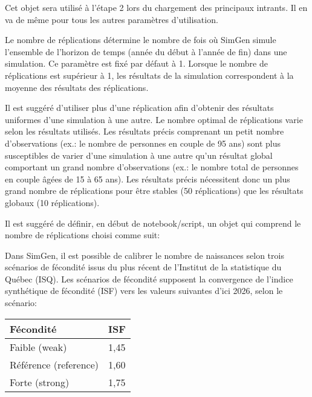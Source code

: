 \documentclass[letterpaper,10pt,french]{sphinxmanual}
\begin{document}
Cet objet sera utilisé à l’étape 2 lors du chargement des principaux intrants. Il en va de même pour tous les autres paramètres d’utilisation.


Le nombre de réplications détermine le nombre de fois où SimGen simule l’ensemble de l’horizon de temps (année du début à l’année de fin) dans une simulation.
Ce paramètre est fixé par défaut à 1. Lorsque le nombre de réplications est supérieur à 1, les résultats de la simulation correspondent à la moyenne des résultats des réplications.

Il est suggéré d’utiliser plus d’une réplication afin d’obtenir des résultats uniformes d’une simulation à une autre.
Le nombre optimal de réplications varie selon les résultats utilisés. Les résultats précis comprenant un petit nombre d’observations (ex.: le nombre de personnes en couple de 95 ans) sont plus susceptibles de varier
d’une simulation à une autre qu’un résultat global comportant un grand nombre d’observations (ex.: le nombre total de personnes en couple âgées de 15 à 65 ans).
Les résultats précis nécessitent donc un plus grand nombre de réplications pour être stables (50 réplications)
que les résultats globaux (10 réplications).

Il est suggéré de définir, en début de notebook/script, un objet qui comprend le nombre de réplications choisi comme suit:

\begin{sphinxVerbatim}[commandchars=\\\{\}]
  
\end{sphinxVerbatim}



Dans SimGen, il est possible de calibrer le nombre de naissances selon trois scénarios de fécondité issus du plus récent  de l’Institut de la statistique du Québec (ISQ).
Les scénarios de fécondité supposent la convergence de l’indice synthétique de fécondité (ISF) vers les valeurs suivantes d’ici 2026, selon le scénario:


\begin{savenotes}\sphinxattablestart
\centering
\begin{tabulary}{\linewidth}[t]{|T|T|}
\hline
\sphinxstyletheadfamily 
Fécondité
&\sphinxstyletheadfamily 
ISF
\\
\hline
Faible (weak)
&
1,45
\\
\hline
Référence (reference)
&
1,60
\\
\hline
Forte (strong)
&
1,75
\\
\hline
\end{tabulary}
\par
\sphinxattableend\end{savenotes}
\end{document}
